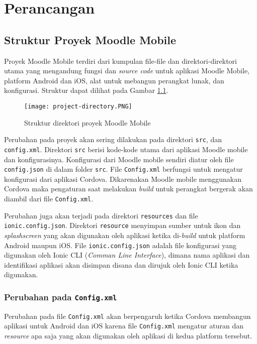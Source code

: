 \chapter{Perancangan}
\label{perancangan} 

\section{Struktur Proyek Moodle Mobile}
\label{struktur proyek}

Proyek Moodle Mobile terdiri dari kumpulan file-file dan direktori-direktori utama yang mengandung fungsi dan \textit{source code} untuk aplikasi Moodle Mobile, platform Android dan iOS, alat untuk mebangun perangkat lunak, dan konfigurasi. Struktur dapat dilihat pada Gambar \ref{fig:project-directory}.
\begin{figure} [H]
	\centering  
	\texttt{[image: project-directory.PNG]}  
	\caption[Struktur direktori proyek Moodle Mobile] {Struktur direktori proyek Moodle Mobile}
	\label{fig:project-directory} 
\end{figure}  

Perubahan pada proyek akan sering dilakukan pada direktori \texttt{src}, dan \texttt{config.xml}. Direktori \texttt{src} berisi kode-kode utama dari aplikasi Moodle mobile dan konfigurasinya. Konfigurasi dari Moodle mobile sendiri diatur oleh file \texttt{config.json} di dalam folder \texttt{src}. File \texttt{Config.xml} berfungsi untuk mengatur konfigurasi dari aplikasi Cordova. Dikarenakan Moodle mobile menggunakan Cordova maka pengaturan saat melakukan \textit{build} untuk perangkat bergerak akan diambil dari file \texttt{Config.xml}. 

Perubahan juga akan terjadi pada direktori \texttt{resources} dan file \texttt{ionic.config.json}. Direktori \texttt{resource} menyimpan sumber untuk ikon dan \textit{splashscreen} yang akan digunakan oleh aplikasi ketika di-\textit{build} untuk platform Android maupun iOS. File \texttt{ionic.config.json} adalah file konfigurasi yang digunakan oleh  Ionic CLI (\textit{Comman Line Interface}), dimana nama aplikasi dan identifikasi aplikasi akan disimpan disana dan dirujuk oleh Ionic CLI ketika digunakan.

\subsection{Perubahan pada \texttt{Config.xml}}
Perubahan pada file \texttt{Config.xml} akan berpengaruh ketika Cordova membangun aplikasi untuk Android dan iOS karena file \texttt{Config.xml} mengatur aturan dan \textit{resource} apa saja yang akan digunakan oleh aplikasi di kedua platform tersebut. 

